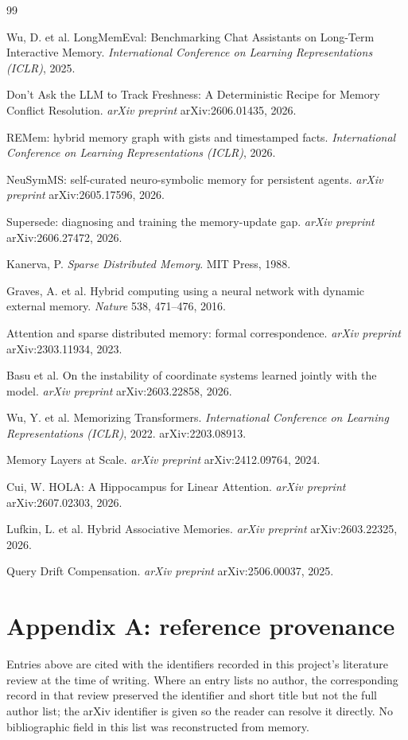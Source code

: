 \documentclass[11pt,a4paper]{article}
\begin{document}
\begin{thebibliography}{99}

 Wu, D. et al. LongMemEval: Benchmarking Chat Assistants on Long-Term
Interactive Memory. \emph{International Conference on Learning Representations (ICLR)}, 2025.

 Don't Ask the LLM to Track Freshness: A Deterministic Recipe for Memory
Conflict Resolution. \emph{arXiv preprint} arXiv:2606.01435, 2026.

 REMem: hybrid memory graph with gists and timestamped facts.
\emph{International Conference on Learning Representations (ICLR)}, 2026.

 NeuSymMS: self-curated neuro-symbolic memory for persistent agents.
\emph{arXiv preprint} arXiv:2605.17596, 2026.

 Supersede: diagnosing and training the memory-update gap.
\emph{arXiv preprint} arXiv:2606.27472, 2026.

 Kanerva, P. \emph{Sparse Distributed Memory}. MIT Press, 1988.

 Graves, A. et al. Hybrid computing using a neural network with dynamic external
memory. \emph{Nature} 538, 471--476, 2016.

 Attention and sparse distributed memory: formal correspondence.
\emph{arXiv preprint} arXiv:2303.11934, 2023.

 Basu et al. On the instability of coordinate systems learned jointly with the model.
\emph{arXiv preprint} arXiv:2603.22858, 2026.

 Wu, Y. et al. Memorizing Transformers.
\emph{International Conference on Learning Representations (ICLR)}, 2022.
arXiv:2203.08913.

 Memory Layers at Scale. \emph{arXiv preprint} arXiv:2412.09764, 2024.

 Cui, W. HOLA: A Hippocampus for Linear Attention.
\emph{arXiv preprint} arXiv:2607.02303, 2026.

 Lufkin, L. et al. Hybrid Associative Memories.
\emph{arXiv preprint} arXiv:2603.22325, 2026.

 Query Drift Compensation. \emph{arXiv preprint} arXiv:2506.00037, 2025.

\end{thebibliography}

\appendix
\section*{Appendix A: reference provenance}

Entries above are cited with the identifiers recorded in this project's literature review at the
time of writing. Where an entry lists no author, the corresponding record in that review preserved
the identifier and short title but not the full author list; the arXiv identifier is given so the
reader can resolve it directly. No bibliographic field in this list was reconstructed from memory.
\end{document}
